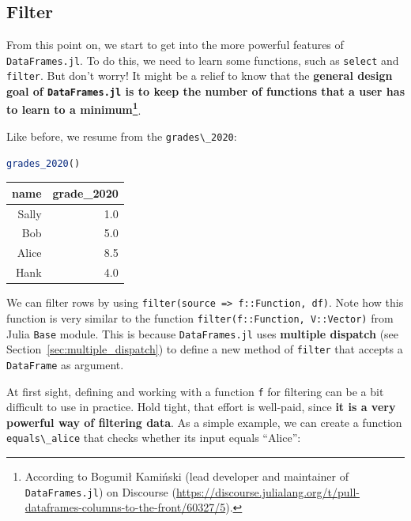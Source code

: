 \documentclass[
  notoc %
]{tufte-book}
\newcommand{\passthrough}[1]{#1}
\begin{document}
\hypertarget{sec:filter}{%
\subsection{Filter}\label{sec:filter}}

From this point on, we start to get into the more powerful features of
\passthrough{\lstinline!DataFrames.jl!}. To do this, we need to learn
some functions, such as \passthrough{\lstinline!select!} and
\passthrough{\lstinline!filter!}. But don't worry! It might be a relief
to know that the \textbf{general design goal of
\passthrough{\lstinline!DataFrames.jl!} is to keep the number of
functions that a user has to learn to a minimum\footnote{According to
  Bogumił Kamiński (lead developer and maintainer of
  \passthrough{\lstinline!DataFrames.jl!}) on Discourse
  (\url{https://discourse.julialang.org/t/pull-dataframes-columns-to-the-front/60327/5}).}}.

Like before, we resume from the \passthrough{\lstinline!grades\_2020!}:

\begin{lstlisting}[language=Julia]
grades_2020()
\end{lstlisting}

\begin{longtable}[]{@{}rr@{}}
\toprule
name & grade\_2020 \\
\midrule
\endhead
Sally & 1.0 \\
Bob & 5.0 \\
Alice & 8.5 \\
Hank & 4.0 \\
\bottomrule
\end{longtable}

We can filter rows by using
\passthrough{\lstinline!filter(source => f::Function, df)!}. Note how
this function is very similar to the function
\passthrough{\lstinline!filter(f::Function, V::Vector)!} from Julia
\passthrough{\lstinline!Base!} module. This is because
\passthrough{\lstinline!DataFrames.jl!} uses \textbf{multiple dispatch}
(see Section~\ref{sec:multiple_dispatch}) to define a new method of
\passthrough{\lstinline!filter!} that accepts a
\passthrough{\lstinline!DataFrame!} as argument.

At first sight, defining and working with a function
\passthrough{\lstinline!f!} for filtering can be a bit difficult to use
in practice. Hold tight, that effort is well-paid, since \textbf{it is a
very powerful way of filtering data}. As a simple example, we can create
a function \passthrough{\lstinline!equals\_alice!} that checks whether
its input equals ``Alice'':
\end{document}
